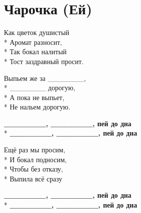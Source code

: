 \section{Чарочка (Ей)}
\label{song:Чарочка_(Ей)}

\medskip

\begin{minipage}{\linewidth}
Как цветок душистый\\*
Аромат разносит,\\*
Так бокал налитый\\*
Тост заздравный просит.\\
\end{minipage}\par\medskip\nobreak

\medskip

\begin{minipage}{\linewidth}
Выпьем же за \_\_\_\_\_\_\_,\\*
\_\_\_\_\_\_\_ дорогую,\\*
А пока не выпьет,\\*
Не нальем дорогую.\\
\end{minipage}\par\medskip\nobreak

\medskip

\begin{minipage}{\linewidth}
\hspace*{1.5em}\textbf{\_\_\_\_\_\_\_, \_\_\_\_\_\_\_, пей до дна}\\*
\hspace*{1.5em}\textbf{\_\_\_\_\_\_\_, \_\_\_\_\_\_\_, пей до дна}\\
\end{minipage}\par\medskip\nobreak

\medskip

\begin{minipage}{\linewidth}
Ещё раз мы просим,\\*
И бокал подносим,\\*
Чтобы без отказу,\\*
Выпила всё сразу\\
\end{minipage}\par\medskip\nobreak

\medskip

\begin{minipage}{\linewidth}
\hspace*{1.5em}\textbf{\_\_\_\_\_\_\_, \_\_\_\_\_\_\_, пей до дна}\\*
\hspace*{1.5em}\textbf{\_\_\_\_\_\_\_, \_\_\_\_\_\_\_, пей до дна}\\
\end{minipage}\par\medskip\nobreak

